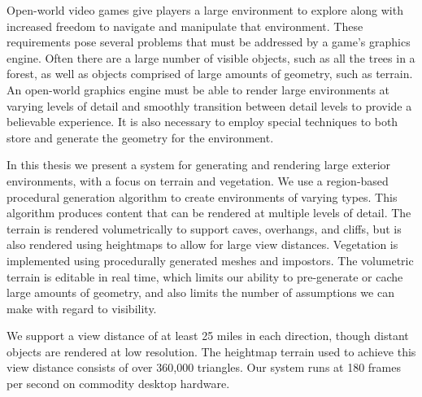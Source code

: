 Open-world video games give players a large environment to explore along with increased freedom to navigate and manipulate that environment.
These requirements pose several problems that must be addressed by a game's graphics engine.
Often there are a large number of visible objects, such as all the trees in a forest, as well as objects comprised of large amounts of geometry, such as terrain.
An open-world graphics engine must be able to render large environments at varying levels of detail and smoothly transition between detail levels to provide a believable experience.
It is also necessary to employ special techniques to both store and generate the geometry for the environment.

In this thesis we present a system for generating and rendering large exterior environments, with a focus on terrain and vegetation.
We use a region-based procedural generation algorithm to create environments of varying types.
This algorithm produces content that can be rendered at multiple levels of detail.
The terrain is rendered volumetrically to support caves, overhangs, and cliffs, but is also rendered using heightmaps to allow for large view distances.
Vegetation is implemented using procedurally generated meshes and impostors.
The volumetric terrain is editable in real time, which limits our ability to pre-generate or cache large amounts of geometry, and also limits the number of assumptions we can make with regard to visibility.

We support a view distance of at least 25 miles in each direction, though distant objects are rendered at low resolution.
The heightmap terrain used to achieve this view distance consists of over 360,000 triangles.
Our system runs at 180 frames per second on commodity desktop hardware.
